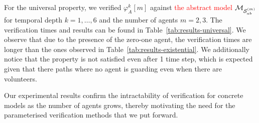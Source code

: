 For the universal property, we verified $\varphi^k_A[m]$ against
\textcolor{red}{the abstract model} $\mathcal{M}_{\mathcal{S}_{ab}^{(m)}}$ for temporal depth
$k = 1,\dots,6$ and the number of agents $m=2,3$. The verification times and
results can be found in Table~\ref{tab:results-universal}. We observe that due
to the presence of the zero-one agent, the verification times are longer than
the ones observed in Table~\ref{tab:results-existential}. We additionally
notice that the property is not satisfied even after 1 time step, which is
expected given that there paths where no agent is guarding even when there are
volunteers.

Our experimental results confirm the intractability of verification for
concrete models as the number of agents grows, thereby motivating the need for
the parameterised verification methods that we put forward.








